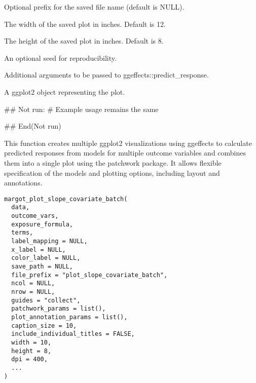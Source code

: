 \documentclass[a4paper]{book}
\begin{document}
\begin{Arguments}
\begin{ldescription}
\item[\code{prefix}] Optional prefix for the saved file name (default is NULL).

\item[\code{width}] The width of the saved plot in inches. Default is 12.

\item[\code{height}] The height of the saved plot in inches. Default is 8.

\item[\code{seed}] An optional seed for reproducibility.

\item[\code{...}] Additional arguments to be passed to ggeffects::predict\_response.
\end{ldescription}
\end{Arguments}
%
\begin{Value}
A ggplot2 object representing the plot.
\end{Value}
%
\begin{Examples}
\begin{ExampleCode}
## Not run: 
# Example usage remains the same

## End(Not run)
\end{ExampleCode}
\end{Examples}
%
\begin{Description}
This function creates multiple ggplot2 visualizations using ggeffects to calculate
predicted responses from models for multiple outcome variables and combines them
into a single plot using the patchwork package. It allows flexible specification
of the models and plotting options, including layout and annotations.
\end{Description}
%
\begin{Usage}
\begin{verbatim}
margot_plot_slope_covariate_batch(
  data,
  outcome_vars,
  exposure_formula,
  terms,
  label_mapping = NULL,
  x_label = NULL,
  color_label = NULL,
  save_path = NULL,
  file_prefix = "plot_slope_covariate_batch",
  ncol = NULL,
  nrow = NULL,
  guides = "collect",
  patchwork_params = list(),
  plot_annotation_params = list(),
  caption_size = 10,
  include_individual_titles = FALSE,
  width = 10,
  height = 8,
  dpi = 400,
  ...
)
\end{verbatim}
\end{Usage}
%
\end{document}
